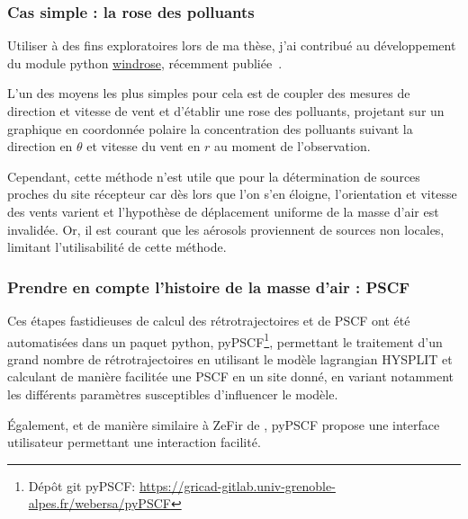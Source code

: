 \subsubsection{Cas simple : la rose des polluants}%
\label{ssub:cas_simple_la_rose_des_polluants}

\begin{tcolorbox}[colback=red!5!white,colframe=Melon,title=Note]
    Utiliser à des fins exploratoires lors de ma thèse, j'ai contribué au développement
    du module python \href{https://github.com/python-windrose/windrose/}{windrose},
    récemment publiée~\autocite{scls19frPythonwindrose2019}.
\end{tcolorbox}

L'un des moyens les plus simples pour cela est de coupler des mesures de direction et
vitesse de vent et d'établir une rose des polluants, projetant sur un graphique en
coordonnée polaire la concentration des polluants suivant la direction en $\theta$ et
vitesse du vent en $r$ au moment de l'observation.

Cependant, cette méthode n'est utile que pour la détermination de sources proches du site
récepteur car dès lors que l'on s'en éloigne, l'orientation et vitesse des vents varient
et l'hypothèse de déplacement uniforme de la masse d'air est invalidée.  Or, il est
courant que les aérosols proviennent de sources non locales, limitant l'utilisabilité de
cette méthode.


\subsubsection{Prendre en compte l'histoire de la masse d'air : PSCF}%
\label{sub:prendre_en_compte_l_histoire_de_la_masse_d_air_PSCF}

\begin{tcolorbox}[colback=red!5!white,colframe=Melon,title=Note]
    Ces étapes fastidieuses de calcul des rétrotrajectoires et de PSCF ont été
    automatisées
    dans un paquet python, pyPSCF\footnote{Dépôt git pyPSCF:
    \url{https://gricad-gitlab.univ-grenoble-alpes.fr/webersa/pyPSCF}}, permettant le
    traitement d'un grand nombre de rétrotrajectoires en utilisant le modèle lagrangian
    HYSPLIT et calculant de manière facilitée une PSCF en un site donné, en variant
    notamment les différents paramètres susceptibles d'influencer le modèle.

    Également, et de manière similaire à ZeFir de \cite{petitUserfriendly2017}, pyPSCF
    propose une interface utilisateur permettant une interaction facilité.
\end{tcolorbox}

